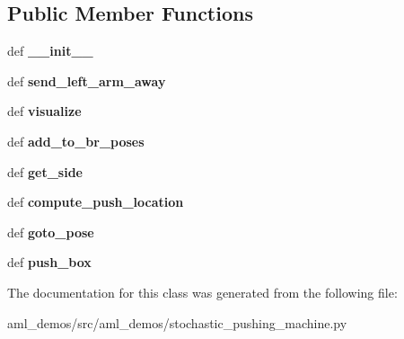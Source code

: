 \subsection*{Public Member Functions}
\begin{DoxyCompactItemize}
\item 
\hypertarget{classaml__demos_1_1stochastic__pushing__machine_1_1_stochastic_push_machine_a1dc25b68d4fe5ddf2c39facaa4f5f22b}{def {\bfseries \-\_\-\-\_\-init\-\_\-\-\_\-}}\label{classaml__demos_1_1stochastic__pushing__machine_1_1_stochastic_push_machine_a1dc25b68d4fe5ddf2c39facaa4f5f22b}

\item 
\hypertarget{classaml__demos_1_1stochastic__pushing__machine_1_1_stochastic_push_machine_a9c76ba37a027d20e2767ce6ff4fe2569}{def {\bfseries send\-\_\-left\-\_\-arm\-\_\-away}}\label{classaml__demos_1_1stochastic__pushing__machine_1_1_stochastic_push_machine_a9c76ba37a027d20e2767ce6ff4fe2569}

\item 
\hypertarget{classaml__demos_1_1stochastic__pushing__machine_1_1_stochastic_push_machine_a5714b680ccf920df3150870b35516350}{def {\bfseries visualize}}\label{classaml__demos_1_1stochastic__pushing__machine_1_1_stochastic_push_machine_a5714b680ccf920df3150870b35516350}

\item 
\hypertarget{classaml__demos_1_1stochastic__pushing__machine_1_1_stochastic_push_machine_a13de5ed05eb405803dea73f495eff60a}{def {\bfseries add\-\_\-to\-\_\-br\-\_\-poses}}\label{classaml__demos_1_1stochastic__pushing__machine_1_1_stochastic_push_machine_a13de5ed05eb405803dea73f495eff60a}

\item 
\hypertarget{classaml__demos_1_1stochastic__pushing__machine_1_1_stochastic_push_machine_abc6afb44c63628b0ec0f680972368bc2}{def {\bfseries get\-\_\-side}}\label{classaml__demos_1_1stochastic__pushing__machine_1_1_stochastic_push_machine_abc6afb44c63628b0ec0f680972368bc2}

\item 
\hypertarget{classaml__demos_1_1stochastic__pushing__machine_1_1_stochastic_push_machine_ab8e65738f0383dcbecbb86cc00ee6dc6}{def {\bfseries compute\-\_\-push\-\_\-location}}\label{classaml__demos_1_1stochastic__pushing__machine_1_1_stochastic_push_machine_ab8e65738f0383dcbecbb86cc00ee6dc6}

\item 
\hypertarget{classaml__demos_1_1stochastic__pushing__machine_1_1_stochastic_push_machine_ade0454dbdb2f2ceb62a49fce80e0cef9}{def {\bfseries goto\-\_\-pose}}\label{classaml__demos_1_1stochastic__pushing__machine_1_1_stochastic_push_machine_ade0454dbdb2f2ceb62a49fce80e0cef9}

\item 
\hypertarget{classaml__demos_1_1stochastic__pushing__machine_1_1_stochastic_push_machine_a6ce1702960b8acd9f58d7dcb916312f6}{def {\bfseries push\-\_\-box}}\label{classaml__demos_1_1stochastic__pushing__machine_1_1_stochastic_push_machine_a6ce1702960b8acd9f58d7dcb916312f6}

\end{DoxyCompactItemize}


The documentation for this class was generated from the following file\-:\begin{DoxyCompactItemize}
\item 
aml\-\_\-demos/src/aml\-\_\-demos/stochastic\-\_\-pushing\-\_\-machine.\-py\end{DoxyCompactItemize}
